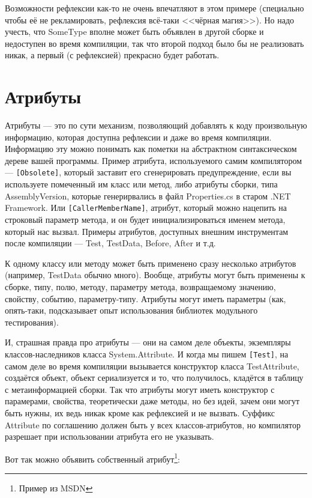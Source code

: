 \documentclass{../../text-style}
\begin{document}
Возможности рефлексии как-то не очень впечатляют в этом примере (специально чтобы её не рекламировать, рефлексия всё-таки <<чёрная магия>>). Но надо учесть, что SomeType вполне может быть объявлен в другой сборке и недоступен во время компиляции, так что второй подход было бы не реализовать никак, а первый (с рефлексией) прекрасно будет работать.

\section{Атрибуты}

Атрибуты --- это по сути механизм, позволяющий добавлять к коду произвольную информацию, которая доступна рефлексии и даже во время компиляции. Информацию эту можно понимать как пометки на абстрактном синтаксическом дереве вашей программы. Пример атрибута, используемого самим компилятором --- \texttt{[Obsolete]}, который заставит его сгенерировать предупреждение, если вы используете помеченный им класс или метод, либо атрибуты сборки, типа AssemblyVersion, которые генерирвались в файл Properties.cs в старом .NET Framework. Или \texttt{[CallerMemberName]}, атрибут, который можно нацепить на строковый параметр метода, и он будет инициализироваться именем метода, который нас вызвал. Примеры атрибутов, доступных внешним инструментам после компиляции --- Test, TestData, Before, After и т.д. 

К одному классу или методу может быть применено сразу несколько атрибутов (например, TestData обычно много). Вообще, атрибуты могут быть применены к сборке, типу, полю, методу, параметру метода, возвращаемому значению, свойству, событию, параметру-типу. Атрибуты могут иметь параметры (как, опять-таки, подсказывает опыт использования библиотек модульного тестирования). 

И, страшная правда про атрибуты --- они на самом деле объекты, экземпляры классов-наследников класса System.Attribute. И когда мы пишем \texttt{[Test]}, на самом деле во время компиляции вызывается конструктор класса TestAttribute, создаётся объект, объект сериализуется и то, что получилось, кладётся в таблицу с метаинформацией сборки. Так что атрибуты могут иметь конструктор с парамерами, свойства, теоретически даже методы, но без идей, зачем они могут быть нужны, их ведь никак кроме как рефлексией и не вызвать. Суффикс Attribute по соглашению должен быть у всех классов-атрибутов, но компилятор разрешает при использовании атрибута его не указывать.

Вот так можно объявить собственный атрибут\footnote{Пример из MSDN}:
\end{document}
